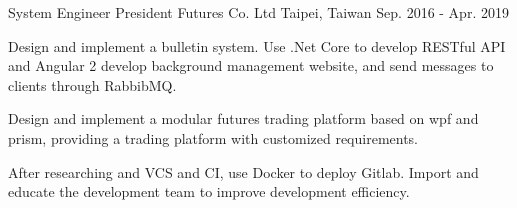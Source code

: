 \begin{cventries}

\cventry
{System Engineer} %
{President Futures Co. Ltd} %
{Taipei, Taiwan} %
{Sep. 2016 - Apr. 2019} %
{
  \begin{cvitems} %
    \item {Design and implement a bulletin system. Use .Net Core to develop RESTful API and Angular 2 develop background management website, and send messages to clients through RabbibMQ.}
    \item {Design and implement a modular futures trading platform based on wpf and prism, providing a trading platform with customized requirements.}
    \item {After researching and VCS and CI, use Docker to deploy Gitlab. Import and educate the development team to improve development efficiency.}
  \end{cvitems}
}

\end{cventries}
